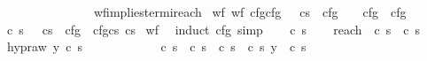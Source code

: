\begin{isabellebody}
\ \ \ \ \ \ \isamarkupfalse%
\isanewline
\ \ \ \ \isamarkupfalse%
\isanewline
\ \ \isamarkupfalse%
\isanewline
{}\isamarkupfalse%
%
\endisatagproof
{\isafoldproof}%
%
\isadelimproof
\isanewline
%
\endisadelimproof
\isanewline
{}\isamarkupfalse%
\ wf{\isacharunderscore}implies{\isacharunderscore}termi{\isacharunderscore}reach{\isacharcolon}\isanewline
{}\ wf{\isacharcolon}\ {\isachardoublequoteopen}wf\ {\isacharbraceleft}{\isacharparenleft}cfg{}{\isacharcomma}cfg{}{\isacharparenright}{\isachardot}\ {\isasymGamma}\ {\isasymturnstile}\ {\isacharparenleft}c{\isacharcomma}s{\isacharparenright}\ {\isasymrightarrow}\isactrlsup {\isacharasterisk}\ cfg{}\ {\isasymand}\ {\isasymGamma}\ {\isasymturnstile}\ cfg{}\ {\isasymrightarrow}\ cfg{}{\isacharbraceright}{\isachardoublequoteclose}\isanewline
{}\ {\isachardoublequoteopen}{\isasymAnd}c{}\ s{}{\isachardot}\ {\isasymlbrakk}{\isasymGamma}\ {\isasymturnstile}\ {\isacharparenleft}c{\isacharcomma}s{\isacharparenright}\ {\isasymrightarrow}\isactrlsup {\isacharasterisk}\ cfg{}{\isacharsemicolon}\ \ cfg{}{\isacharequal}{\isacharparenleft}c{}{\isacharcomma}s{}{\isacharparenright}{\isasymrbrakk}{\isasymLongrightarrow}\ {\isasymGamma}{\isasymturnstile}c{}{\isasymdown}s{}{\isachardoublequoteclose}\isanewline
%
\isadelimproof
%
\endisadelimproof
%
\isatagproof
{}\isamarkupfalse%
\ wf\ \isanewline
{}\isamarkupfalse%
\ {\isacharparenleft}induct\ cfg{}{\isacharcomma}\ simp{\isacharparenright}\isanewline
\ \ \isamarkupfalse%
\ c{}\ s{}\isanewline
\ \ \isamarkupfalse%
\ reach{\isacharcolon}\ {\isachardoublequoteopen}{\isasymGamma}{\isasymturnstile}\ {\isacharparenleft}c{\isacharcomma}\ s{\isacharparenright}\ {\isasymrightarrow}\isactrlsup {\isacharasterisk}\ {\isacharparenleft}c{}{\isacharcomma}\ s{}{\isacharparenright}{\isachardoublequoteclose}\isanewline
\ \ \isamarkupfalse%
\ hyp{\isacharunderscore}raw{\isacharcolon}\ {\isachardoublequoteopen}{\isasymAnd}y\ c{}\ s{}{\isachardot}\isanewline
\ \ \ \ \ \ \ \ \ \ \ {\isasymlbrakk}{\isasymGamma}{\isasymturnstile}\ {\isacharparenleft}c{}{\isacharcomma}\ s{}{\isacharparenright}\ {\isasymrightarrow}\ {\isacharparenleft}c{}{\isacharcomma}\ s{}{\isacharparenright}{\isacharsemicolon}\ {\isasymGamma}{\isasymturnstile}\ {\isacharparenleft}c{\isacharcomma}\ s{\isacharparenright}\ {\isasymrightarrow}\isactrlsup {\isacharasterisk}\ {\isacharparenleft}c{}{\isacharcomma}\ s{}{\isacharparenright}{\isacharsemicolon}\ y\ {\isacharequal}\ {\isacharparenleft}c{}{\isacharcomma}\ s{}{\isacharparenright}{\isasymrbrakk}\isanewline

\end{isabellebody}
